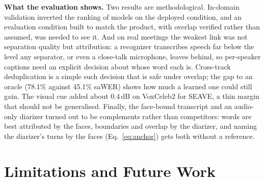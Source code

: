 \documentclass[conference]{IEEEtran}
\newcommand{\dB}{\,dB\xspace}
\begin{document}
\textbf{What the evaluation shows.} Two results are methodological. In-domain validation inverted the ranking of models on the deployed condition, and an evaluation condition built to match the product, with overlap verified rather than assumed, was needed to see it. And on real meetings the weakest link was not separation quality but attribution: a recognizer transcribes speech far below the level any separator, or even a close-talk microphone, leaves behind, so per-speaker captions need an explicit decision about whose word each is. Cross-track deduplication is a simple such decision that is safe under overlap; the gap to an oracle (78.1\% against 45.1\% saWER) shows how much a learned one could still gain. The visual cue added about 0.4\dB on VoxCeleb2 for SEAVE, a thin margin that should not be generalised. Finally, the face-bound transcript and an audio-only diarizer turned out to be complements rather than competitors: words are best attributed by the faces, boundaries and overlap by the diarizer, and naming the diarizer's turns by the faces (Eq.~\eqref{eq:anchor}) gets both without a reference.

\section{Limitations and Future Work}
\label{sec:limits}
\end{document}
